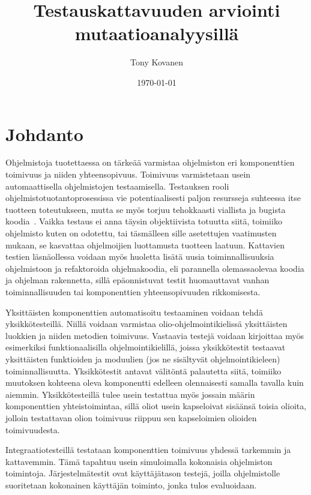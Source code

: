 \documentclass[finnish]{tktltiki2}
\title{Testauskattavuuden arviointi mutaatioanalyysillä}
\author{Tony Kovanen}
\date{\today}
\begin{document}
\frontmatter

\maketitle
\makeabstract

\tableofcontents

\mainmatter

\section{Johdanto}
Ohjelmistoja tuotettaessa on tärkeää varmistaa ohjelmiston eri komponenttien toimivuus ja niiden yhteensopivuus. Toimivuus varmistetaan usein automaattisella ohjelmistojen testaamisella. Testauksen rooli ohjelmistotuotantoprosessissa vie potentiaalisesti paljon resursseja suhteessa itse tuotteen toteutukseen, mutta se myös torjuu tehokkaasti viallista ja bugista koodia~\cite{SchulerZ10}. Vaikka testaus ei anna täysin objektiivista totuutta siitä, toimiiko ohjelmisto kuten on odotettu, tai täsmälleen sille asetettujen vaatimusten mukaan, se kasvattaa ohjelmoijien luottamusta tuotteen laatuun. Kattavien testien läsnäollessa voidaan myös huoletta lisätä uusia toiminnallisuuksia ohjelmistoon ja refaktoroida ohjelmakoodia, eli parannella olemassaolevaa koodia ja ohjelman rakennetta, sillä epäonnistuvat testit huomauttavat vanhan toiminnallisuuden tai komponenttien yhteensopivuuden rikkomisesta. 

Yksittäisten komponenttien automatisoitu testaaminen voidaan tehdä yksikkötesteillä. Niillä voidaan varmistaa olio-ohjelmointikielissä yksittäisten luokkien ja niiden metodien toimivuus. Vastaavia testejä voidaan kirjoittaa myös esimerkiksi funktionaalisilla ohjelmointikielillä, joissa yksikkötestit testaavat yksittäisten funktioiden ja moduulien (jos ne sisältyvät ohjelmointikieleen) toiminnallisuutta. Yksikkötestit antavat välitöntä palautetta siitä, toimiiko muutoksen kohteena oleva komponentti edelleen olennaisesti samalla tavalla kuin aiemmin. Yksikkötesteillä tulee usein testattua myös jossain määrin komponenttien yhteistoimintaa, sillä oliot usein kapseloivat sisäänsä toisia olioita, jolloin testattavan olion toimivuus riippuu sen kapseloimien olioiden toimivuudesta. 

Integraatiotesteillä testataan komponenttien toimivuus yhdessä tarkemmin ja kattavemmin. Tämä tapahtuu usein simuloimalla kokonaisia ohjelmiston toimintoja. Järjestelmätestit ovat käyttäjätason testejä, joilla ohjelmistolle suoritetaan kokonainen käyttäjän toiminto, jonka tulos evaluoidaan. 
\end{document}
